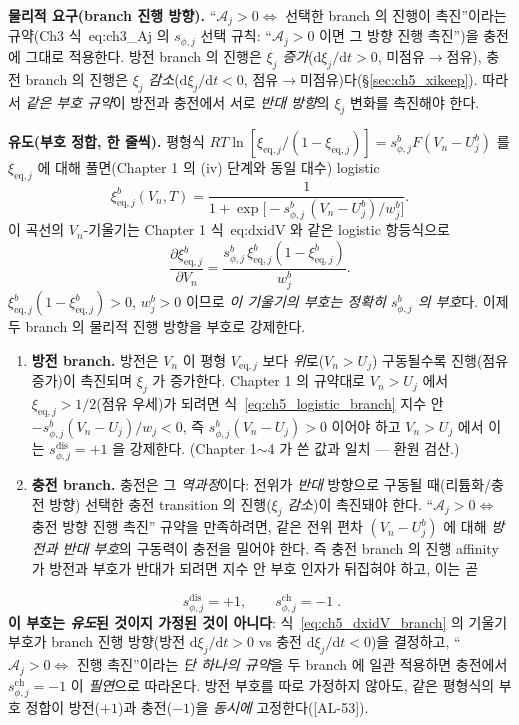 \documentclass[11pt,a4paper]{article}
\newcommand{\dd}{\mathrm{d}}
\newcommand{\eq}{\mathrm{eq}}
\newcommand{\dis}{\mathrm{dis}}
\newcommand{\chg}{\mathrm{ch}}
\newcommand{\AL}[1]{\textsf{[AL-#1]}}
\begin{document}
\textbf{물리적 요구(branch 진행 방향).} ``$\mathcal A_j>0\Leftrightarrow$ 선택한 branch 의 진행이 촉진''이라는
규약(Ch3 식~eq:ch3\_Aj 의 $s_{\phi,j}$ 선택 규칙: ``$\mathcal A_j>0$ 이면 그 방향 진행 촉진'')을 충전에 그대로
적용한다. 방전 branch 의 진행은 $\xi_j$ \emph{증가}($\dd\xi_j/\dd t>0$, 미점유$\to$점유), 충전 branch 의 진행은
$\xi_j$ \emph{감소}($\dd\xi_j/\dd t<0$, 점유$\to$미점유)다(\S\ref{sec:ch5_xikeep}). 따라서 \emph{같은 부호 규약}이
방전과 충전에서 서로 \emph{반대 방향}의 $\xi_j$ 변화를 촉진해야 한다.

\textbf{유도(부호 정합, 한 줄씩).} 평형식 $RT\ln[\xi_{\eq,j}/(1-\xi_{\eq,j})]=s_{\phi,j}^b F(V_n-U_j^b)$ 를
$\xi_{\eq,j}$ 에 대해 풀면(Chapter 1 의 (iv) 단계와 동일 대수) logistic
\begin{equation}
\xi_{\eq,j}^b(V_n,T)=\frac{1}{1+\exp\!\big[-s_{\phi,j}^b\,(V_n-U_j^b)/w_j^b\big]}.
\label{eq:ch5_logistic_branch}
\end{equation}
이 곡선의 $V_n$-기울기는 Chapter 1 식~eq:dxidV 와 같은 logistic 항등식으로
\begin{equation}
\frac{\partial\xi_{\eq,j}^b}{\partial V_n}=\frac{s_{\phi,j}^b\,\xi_{\eq,j}^b(1-\xi_{\eq,j}^b)}{w_j^b}.
\label{eq:ch5_dxidV_branch}
\end{equation}
$\xi_{\eq,j}^b(1-\xi_{\eq,j}^b)>0$, $w_j^b>0$ 이므로 \emph{이 기울기의 부호는 정확히 $s_{\phi,j}^b$ 의 부호}다.
이제 두 branch 의 물리적 진행 방향을 부호로 강제한다.
\begin{enumerate}[label=(\roman*),leftmargin=2.2em]
\item \textbf{방전 branch.} 방전은 $V_n$ 이 평형 $V_{\eq,j}$ 보다 \emph{위}로($V_n>U_j$) 구동될수록 진행(점유
  증가)이 촉진되며 $\xi_j$ 가 증가한다. Chapter 1 의 규약대로 $V_n>U_j$ 에서 $\xi_{\eq,j}>1/2$(점유 우세)가 되려면
  식~\eqref{eq:ch5_logistic_branch} 지수 안 $-s_{\phi,j}^b(V_n-U_j)/w_j<0$, 즉 $s_{\phi,j}^b(V_n-U_j)>0$ 이어야
  하고 $V_n>U_j$ 에서 이는 $s_{\phi,j}^\dis=+1$ 을 강제한다. (Chapter 1$\sim$4 가 쓴 값과 일치 — 환원 검산.)
\item \textbf{충전 branch.} 충전은 그 \emph{역과정}이다: 전위가 \emph{반대} 방향으로 구동될 때(리튬화/충전
  방향) 선택한 충전 transition 의 진행($\xi_j$ \emph{감소})이 촉진돼야 한다. ``$\mathcal A_j>0\Leftrightarrow$
  충전 방향 진행 촉진'' 규약을 만족하려면, 같은 전위 편차 $(V_n-U_j^b)$ 에 대해 \emph{방전과 반대 부호}의
  구동력이 충전을 밀어야 한다. 즉 충전 branch 의 진행 affinity 가 방전과 부호가 반대가 되려면 지수 안 부호
  인자가 뒤집혀야 하고, 이는 곧
\end{enumerate}
\begin{equation}
\boxed{\;s_{\phi,j}^\dis=+1,\qquad s_{\phi,j}^\chg=-1\;.}
\label{eq:ch5_schg}
\end{equation}
\textbf{이 부호는 \emph{유도}된 것이지 가정된 것이 아니다}: 식~\eqref{eq:ch5_dxidV_branch} 의 기울기 부호가
branch 진행 방향(방전 $\dd\xi_j/\dd t>0$ vs 충전 $\dd\xi_j/\dd t<0$)을 결정하고, ``$\mathcal A_j>0\Leftrightarrow$
진행 촉진''이라는 \emph{단 하나의 규약}을 두 branch 에 일관 적용하면 충전에서 $s_{\phi,j}^\chg=-1$ 이
\emph{필연}으로 따라온다. 방전 부호를 따로 가정하지 않아도, 같은 평형식의 부호 정합이 방전($+1$)과 충전($-1$)을
\emph{동시에} 고정한다(\AL{53}).
\end{document}
